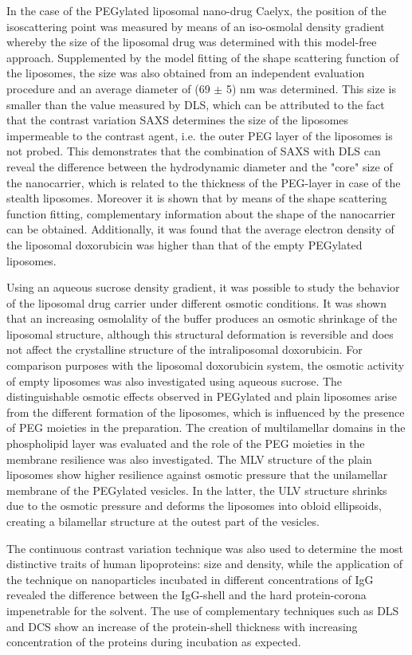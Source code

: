In the case of the PEGylated liposomal nano-drug Caelyx, the position of the isoscattering point was measured by means of an iso-osmolal density gradient whereby the size of the liposomal drug was determined with this model-free approach. Supplemented by the model fitting of the shape scattering function of the liposomes, the size was also obtained from an independent evaluation procedure and an average diameter of (69 $\pm$ 5) nm was determined. This size is smaller than the value measured by DLS, which can be attributed to the fact that the contrast variation SAXS determines the size of the liposomes impermeable to the contrast agent, i.e. the outer PEG layer of the liposomes is not probed. This demonstrates that the combination of SAXS with DLS can reveal the difference between the hydrodynamic diameter and the "core" size of the nanocarrier, which is related to the thickness of the PEG-layer in case of the stealth liposomes. Moreover it is shown that by means of the shape scattering function fitting, complementary information about the shape of the nanocarrier can be obtained. Additionally, it was found that the average electron density of the liposomal doxorubicin was higher than that of the empty PEGylated liposomes.

Using an aqueous sucrose density gradient, it was possible to study the behavior of the liposomal drug carrier under different osmotic conditions. It was shown that an increasing osmolality of the buffer produces an osmotic shrinkage of the liposomal structure, although this structural deformation is reversible and does not affect the crystalline structure of the intraliposomal doxorubicin. For comparison purposes with the liposomal doxorubicin system, the osmotic activity of empty liposomes was also investigated using aqueous sucrose. The distinguishable osmotic effects observed in PEGylated and plain liposomes arise from the different formation of the liposomes, which is influenced by the presence of PEG moieties in the preparation. The creation of multilamellar domains in the phospholipid layer was evaluated and the role of the PEG moieties in the membrane resilience was also investigated. The MLV structure of the plain liposomes show higher resilience against osmotic pressure that the unilamellar membrane of the PEGylated vesicles. In the latter, the ULV structure shrinks due to the osmotic pressure and deforms the liposomes into obloid ellipsoids, creating a bilamellar structure at the outest part of the vesicles.

The continuous contrast variation technique was also used to determine the most distinctive traits of human lipoproteins: size and density, while the application of the technique on nanoparticles incubated in different concentrations of IgG revealed the difference between the IgG-shell and the hard protein-corona impenetrable for the solvent. The use of complementary techniques such as DLS and DCS show an increase of the protein-shell thickness with increasing concentration of the proteins during incubation as expected.

